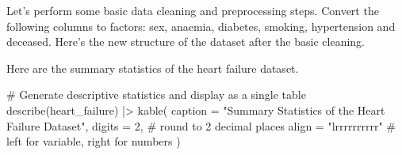 \documentclass[
  letterpaper,
  DIV=11,
  numbers=noendperiod]{scrartcl}
\newenvironment{Shaded}{\begin{snugshade}}{\end{snugshade}}
\newcommand{\AttributeTok}[1]{\textcolor[rgb]{0.40,0.45,0.13}{#1}}
\newcommand{\CommentTok}[1]{\textcolor[rgb]{0.37,0.37,0.37}{#1}}
\newcommand{\DecValTok}[1]{\textcolor[rgb]{0.68,0.00,0.00}{#1}}
\newcommand{\FunctionTok}[1]{\textcolor[rgb]{0.28,0.35,0.67}{#1}}
\newcommand{\NormalTok}[1]{\textcolor[rgb]{0.00,0.23,0.31}{#1}}
\newcommand{\OtherTok}[1]{\textcolor[rgb]{0.00,0.23,0.31}{#1}}
\newcommand{\SpecialCharTok}[1]{\textcolor[rgb]{0.37,0.37,0.37}{#1}}
\newcommand{\StringTok}[1]{\textcolor[rgb]{0.13,0.47,0.30}{#1}}
\begin{document}
Let's perform some basic data cleaning and preprocessing steps. Convert
the following columns to factors: sex, anaemia, diabetes, smoking,
hypertension and deceased. Here's the new structure of the dataset after
the basic cleaning.

\begin{Shaded}
\end{Shaded}

Here are the summary statistics of the heart failure dataset.

\begin{Shaded}
\begin{Highlighting}[]
\CommentTok{\# Generate descriptive statistics and display as a single table}
\FunctionTok{describe}\NormalTok{(heart\_failure) }\SpecialCharTok{|\textgreater{}}
  \FunctionTok{kable}\NormalTok{(}
    \AttributeTok{caption =} \StringTok{"Summary Statistics of the Heart Failure Dataset"}\NormalTok{,}
    \AttributeTok{digits =} \DecValTok{2}\NormalTok{,  }\CommentTok{\# round to 2 decimal places}
    \AttributeTok{align =} \StringTok{"lrrrrrrrrrr"}  \CommentTok{\# left for variable, right for numbers}
\NormalTok{  )}
\end{Highlighting}
\end{Shaded}
\end{document}

